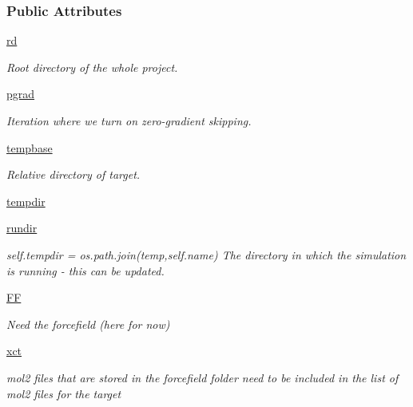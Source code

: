 \subsubsection*{Public Attributes}
\begin{DoxyCompactItemize}
\item 
\hyperlink{classsrc_1_1target_1_1Target_af85bc6ed8a95bc598f2e72a7213b972e}{rd}
\begin{DoxyCompactList}\small\item\em Root directory of the whole project. \end{DoxyCompactList}\item 
\hyperlink{classsrc_1_1target_1_1Target_a5eb45ee670449762fb6a9885db9889aa}{pgrad}
\begin{DoxyCompactList}\small\item\em Iteration where we turn on zero-\/gradient skipping. \end{DoxyCompactList}\item 
\hyperlink{classsrc_1_1target_1_1Target_ae182b033fbe054ff2daa7659e69a7957}{tempbase}
\begin{DoxyCompactList}\small\item\em Relative directory of target. \end{DoxyCompactList}\item 
\hyperlink{classsrc_1_1target_1_1Target_a7cc95b1ec34fa75172c81469ff6e5d1d}{tempdir}
\item 
\hyperlink{classsrc_1_1target_1_1Target_a9f47e2d3fd02ea26469e880350bdb976}{rundir}
\begin{DoxyCompactList}\small\item\em self.\+tempdir = os.\+path.\+join(\textquotesingle{}temp\textquotesingle{},self.\+name) The directory in which the simulation is running -\/ this can be updated. \end{DoxyCompactList}\item 
\hyperlink{classsrc_1_1target_1_1Target_a64e2f22daa347019ca8beb482c4b59f6}{FF}
\begin{DoxyCompactList}\small\item\em Need the forcefield (here for now) \end{DoxyCompactList}\item 
\hyperlink{classsrc_1_1target_1_1Target_a399fd456592279c108753f3694950620}{xct}
\begin{DoxyCompactList}\small\item\em mol2 files that are stored in the forcefield folder need to be included in the list of mol2 files for the target \end{DoxyCompactList}\item 

\end{DoxyCompactItemize}
